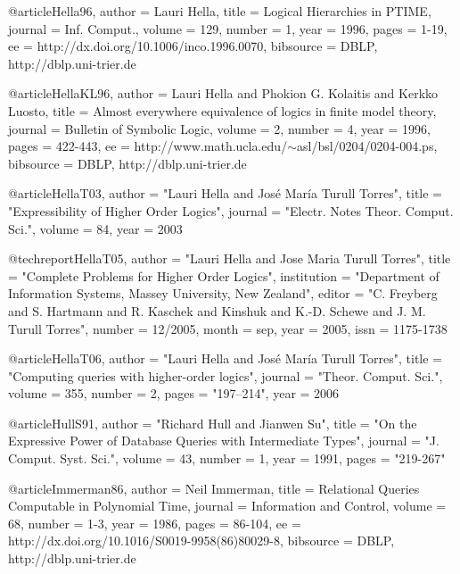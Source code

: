 \documentclass{article}
\begin{document}
@article{Hella96,
  author    = {Lauri Hella},
  title     = {Logical Hierarchies in {PTIME}},
  journal   = {Inf. Comput.},
  volume    = {129},
  number    = {1},
  year      = {1996},
  pages     = {1-19},
  ee        = {http://dx.doi.org/10.1006/inco.1996.0070},
  bibsource = {DBLP, http://dblp.uni-trier.de}
}

@article{HellaKL96,
  author    = {Lauri Hella and
               Phokion G. Kolaitis and
               Kerkko Luosto},
  title     = {Almost everywhere equivalence of logics in finite model
               theory},
  journal   = {Bulletin of Symbolic Logic},
  volume    = {2},
  number    = {4},
  year      = {1996},
  pages     = {422-443},
  ee        = {http://www.math.ucla.edu/$\sim$asl/bsl/0204/0204-004.ps},
  bibsource = {DBLP, http://dblp.uni-trier.de}
}


@article{HellaT03,
  author    = "Lauri Hella and Jos{\'e} Mar{\'i}a {Turull Torres}",
  title     = "Expressibility of Higher Order Logics",
  journal   = "Electr. Notes Theor. Comput. Sci.",
  volume    = 84,
  year      = 2003
}

@techreport{HellaT05,
  author      = "Lauri Hella and Jose Maria {Turull Torres}",
  title	      = "Complete Problems for Higher Order Logics",
  institution = "Department of Information Systems, Massey University, New Zealand",
  editor      = "C. Freyberg and S. Hartmann and R. Kaschek and Kinshuk and K.-D. Schewe and J. M. {Turull Torres}",
  number      = {12/2005},
  month	      = sep,
  year 	      = 2005,
  issn        = {1175-1738}
}

@article{HellaT06,
  author    = "Lauri Hella and Jos{\'e} Mar{\'i}a {Turull Torres}",
  title     = "Computing queries with higher-order logics",
  journal   = "Theor. Comput. Sci.",
  volume    = 355,
  number    = 2,
  pages     = "197--214",
  year      = 2006
}

@article{HullS91,
  author    = "Richard Hull and Jianwen Su",
  title     = "On the Expressive Power of Database Queries with Intermediate Types",
  journal   = "J. Comput. Syst. Sci.",
  volume    = 43,
  number    = 1,
  year      = 1991,
  pages     = "219-267"
}



@article{Immerman86,
  author    = {Neil Immerman},
  title     = {Relational Queries Computable in Polynomial Time},
  journal   = {Information and Control},
  volume    = {68},
  number    = {1-3},
  year      = {1986},
  pages     = {86-104},
  ee        = {http://dx.doi.org/10.1016/S0019-9958(86)80029-8},
  bibsource = {DBLP, http://dblp.uni-trier.de}
}
\end{document}
